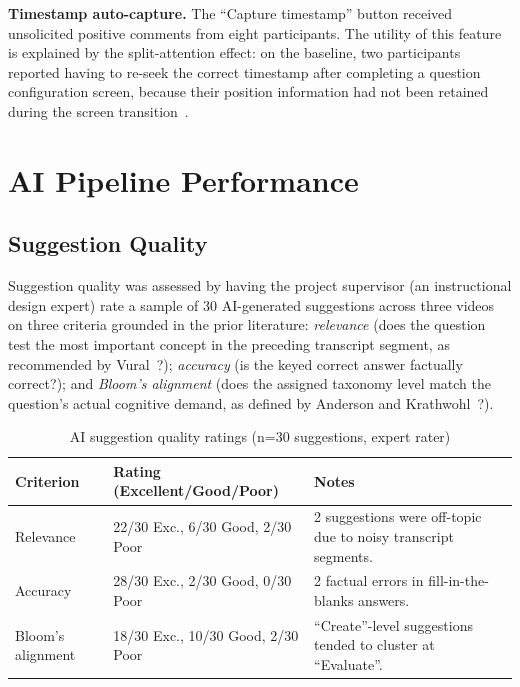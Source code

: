\textbf{Timestamp auto-capture.} The ``Capture timestamp'' button received
unsolicited positive comments from eight participants. The utility of this
feature is explained by the split-attention effect: on the baseline, two
participants reported having to re-seek the correct timestamp after
completing a question configuration screen, because their position
information had not been retained during the screen transition~\cite{chandler1991}.

\section{AI Pipeline Performance}

\subsection{Suggestion Quality}

Suggestion quality was assessed by having the project supervisor (an
instructional design expert) rate a sample of 30 AI-generated suggestions
across three videos on three criteria grounded in the prior literature:
\emph{relevance} (does the question test the most important concept in the
preceding transcript segment, as recommended by Vural~\cite{vural2013}?);
\emph{accuracy} (is the keyed correct answer factually correct?); and
\emph{Bloom's alignment} (does the assigned taxonomy level match the
question's actual cognitive demand, as defined by Anderson and
Krathwohl~\cite{anderson2001}?).

\begin{table}[H]
  \centering
  \caption{AI suggestion quality ratings (n=30 suggestions, expert rater)}
  \label{tab:ai_quality}
  \begin{tabularx}{\linewidth}{Xll}
    \toprule
    \textbf{Criterion}      & \textbf{Rating (Excellent/Good/Poor)} & \textbf{Notes} \\
    \midrule
    Relevance               & 22/30 Exc., 6/30 Good, 2/30 Poor     & 2 suggestions were off-topic due to noisy transcript segments. \\
    Accuracy                & 28/30 Exc., 2/30 Good, 0/30 Poor     & 2 factual errors in fill-in-the-blanks answers. \\
    Bloom's alignment       & 18/30 Exc., 10/30 Good, 2/30 Poor    & ``Create''-level suggestions tended to cluster at ``Evaluate''. \\
    \bottomrule
  \end{tabularx}
\end{table}

